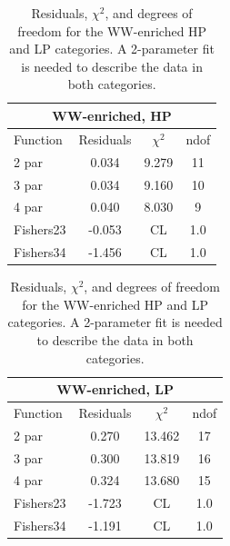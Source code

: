 \begin{table}[h!]
\centering
\begin{tabular}{|l c c c |}
\hline
\multicolumn{4}{|c|}{WW-enriched, HP}\\
\hline
Function & Residuals & $\chi^2$ & ndof \\
\hline
2 par & 0.034 & 9.279 & 11 \\
3 par & 0.034 & 9.160 & 10 \\
4 par & 0.040 & 8.030 & 9 \\
\hline
\hline
Fishers23  & -0.053 &CL &1.0\\
Fishers34  & -1.456 &CL &1.0\\
\hline
\end{tabular}
\quad
\begin{tabular}{|l c c c |}
\hline
\multicolumn{4}{|c|}{WW-enriched, LP}\\
\hline
Function & Residuals & $\chi^2$ & ndof \\
\hline
2 par & 0.270 & 13.462 & 17 \\
3 par & 0.300 & 13.819 & 16 \\
4 par & 0.324 & 13.680 & 15 \\
\hline
\hline
Fishers23 & -1.723& CL & 1.0\\
Fishers34 & -1.191& CL & 1.0\\
\hline
\end{tabular}
\caption{Residuals, $\chi^{2}$, and degrees of freedom for the WW-enriched HP and LP categories. A 2-parameter fit is needed to describe the data in both categories.}
\label{tab:WW_enriched}
\end{table}

